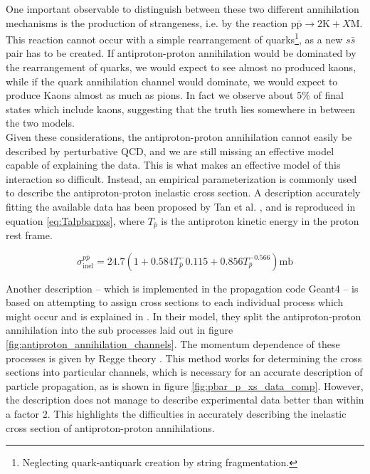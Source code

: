 One important observable to distinguish between these two different annihilation mechanisms is the production of strangeness, i.e. by the reaction $\mathrm{p\bar{p}} \rightarrow 2\mathrm{K}+ X\mathrm{M}$. This reaction cannot occur with a simple rearrangement of quarks\footnote{Neglecting quark-antiquark creation by string fragmentation.}, as a new $s\bar{s}$ pair has to be created. If antiproton-proton annihilation would be dominated by the rearrangement of quarks, we would expect to see almost no produced kaons, while if the quark annihilation channel would dominate, we would expect to produce Kaons almost as much as pions. In fact we observe about 5\% of final states which include kaons\cite{antiproton_cross_sections_review, hidden_Strangeness}, suggesting that the truth lies somewhere in between the two models. \\

Given these considerations, the antiproton-proton annihilation cannot easily be described by perturbative QCD, and we are still missing an effective model capable of explaining the data. This is what makes an effective model of this interaction so difficult. Instead, an empirical parameterization is commonly used to describe the antiproton-proton inelastic cross section. A description accurately fitting the available data has been proposed by Tan et al. \cite{Tan_1983}, and is reproduced in equation \ref{eq:Talpbarpxs}, where $T_{\bar{p}}$ is the antiproton kinetic energy in the proton rest frame. 
%

\begin{equation}\label{eq:Talpbarpxs}
    \sigma_\mathrm{inel}^{p\bar{p}} = 24.7 (1 + 0.584T_{\bar{p}}^-0.115 + 0.856 T_{\bar{p}}^{-0.566}) \mathrm{mb}
\end{equation}

Another description -- which is implemented in the propagation code Geant4 -- is based on attempting to assign cross sections to each individual process which might occur and is explained in \cite{antiproton_dynamics_CERN}. In their model, they split the antiproton-proton annihilation into the sub processes laid out in figure \ref{fig:antiproton_annihilation_channels}. The momentum dependence of these processes is given by Regge theory \cite{antiproton_dynamics_2, antiproton_dynamics_CERN, Regge1959}. This method works for determining the cross sections into particular channels, which is necessary for an accurate description of particle propagation, as is shown in figure \ref{fig:pbar_p_xs_data_comp}. However, the description does not manage to describe experimental data better than within a factor 2. This highlights the difficulties in accurately describing the inelastic cross section of antiproton-proton annihilations.

